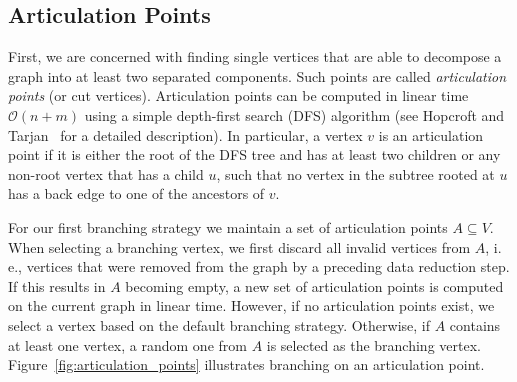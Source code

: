 \documentclass[a4paper,UKenglish,cleveref, autoref, thm-restate]{lipics-v2021}
\newcommand{\ie}{i.\,e.,\xspace}
\begin{document}
\subsection{Articulation Points}
First, we are concerned with finding single vertices that are able to decompose a graph into at least two separated components.
Such points are called \emph{articulation points} (or cut vertices).
Articulation points can be computed in linear time $\mathcal{O}(n+m)$ using a simple depth-first search (DFS) algorithm (see Hopcroft and Tarjan~\cite{hopcroft1973algorithm} for a detailed description).
In particular, a vertex $v$ is an articulation point if it is either the root of
the DFS tree and has at least two children or any non-root vertex that has a child $u$, such that no vertex in
the subtree rooted at $u$ has a back edge to one of the ancestors of
$v$. 

For our first branching strategy we maintain a set of articulation points $A \subseteq V$.
When selecting a branching vertex, we first discard all invalid vertices from
$A$, \ie vertices that were removed from the graph by a preceding data reduction step.
If this results in $A$ becoming empty, a new set of articulation points is computed on the current graph in linear time.
However, if no articulation points exist, we select a vertex based on the default branching strategy.
Otherwise, if $A$ contains at least one vertex, a random one from $A$ is selected as the branching
vertex. Figure~\ref{fig:articulation_points} illustrates branching on an
articulation point.
\end{document}
